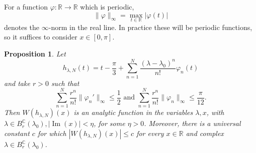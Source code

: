 \documentclass{amsart}
\def \R{\mathbb R}
\def \C{\mathbb C}
\def \im{\operatorname{Im}}
\newtheorem{proposition}{Proposition}
\begin{document}
For a function $\varphi:\R \to \R$ which is periodic, 
\[\| \varphi \|_\infty = \max_{t \in \R} |\varphi(t)| \]
denotes the $\infty$-norm in the real line. In practice these will be periodic functions, so it suffices to consider $x \in [0,\pi]$. 
\begin{proposition}
	\label{prop_analytic}
Let 
\[h_{\lambda,N}(t) = t - \frac \pi 3 + \sum_{n=1}^N \frac{(\lambda-\lambda_0)^n}{n!} \varphi_n(t)\]
and take $r>0$ such that
\begin{equation}
	\label{eq_series_bound}
	\sum_{n=1}^N \frac{r^n}{n!} \|\varphi_n'\|_\infty \leq \frac 12 \text{ and } \sum_{n=1}^N \frac{r^n}{n!} \|\varphi_n\|_\infty \leq \frac \pi {12}.
\end{equation}
Then $W(h_{\lambda,N})(x)$ is an analytic function in the variables $\lambda, x$, with $\lambda \in B^\C_r(\lambda_0), |\im(x)| < \eta$, for some $\eta>0$.
Moreover, there is a universal constant $c$ for which $|W(h_{\lambda,N})(x)| \leq c$ for every $x \in \R$ and complex $\lambda \in B^\C_r(\lambda_0)$.
\end{proposition}
\end{document}
